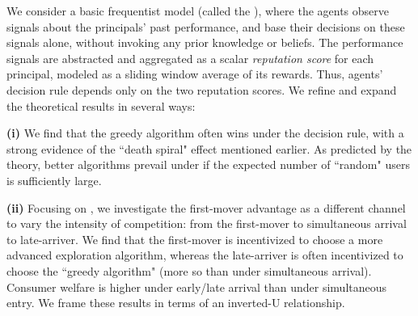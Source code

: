 
We consider a basic frequentist model (called the \emph{\ExptsModel}), where the agents observe signals about the principals' past performance, and base their decisions on these signals alone, without invoking any prior knowledge or beliefs. The performance signals are abstracted and aggregated as a scalar \emph{reputation score} for each principal, modeled as a sliding window average of its rewards. Thus, agents' decision rule depends only on the two reputation scores.
We refine and expand the theoretical results in several ways:

\textbf{(i)}
We find that the greedy algorithm often wins under the \HardMax decision rule, with a strong evidence of the ``death spiral" effect mentioned earlier.
 As predicted by the theory, better algorithms prevail under \HardMaxRandom if the expected number of ``random" users is sufficiently large. 


\textbf{(ii)} Focusing on \HardMax, we investigate the first-mover advantage as a different channel to vary the intensity of competition: from the first-mover to simultaneous arrival to late-arriver. We find that the first-mover is incentivized to choose a more advanced exploration algorithm, whereas the late-arriver is often incentivized to choose the ``greedy algorithm" (more so than under simultaneous arrival). Consumer welfare is higher under early/late arrival than under simultaneous entry. We frame these results in terms of an inverted-U relationship.


